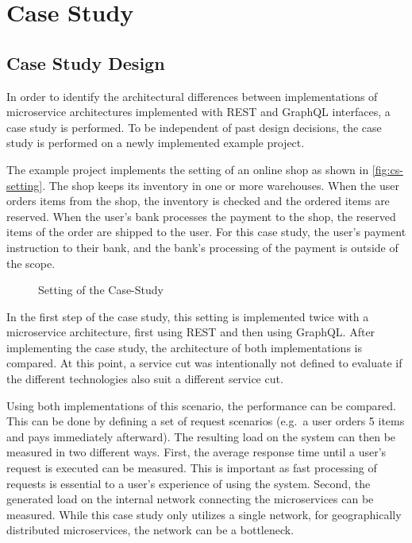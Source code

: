 \section{Case Study}\label{sec:case-study}

\subsection{Case Study Design}

In order to identify the architectural differences between implementations of microservice architectures implemented with REST and GraphQL interfaces, a case study is performed.
To be independent of past design decisions, the case study is performed on a newly implemented example project.

The example project implements the setting of an online shop as shown in \autoref{fig:cs-setting}.
The shop keeps its inventory in one or more warehouses.
When the user orders items from the shop, the inventory is checked and the ordered items are reserved.
When the user's bank processes the payment to the shop, the reserved items of the order are shipped to the user.
For this case study, the user's payment instruction to their bank, and the bank's processing of the payment is outside of the scope.

\begin{figure}[!htb]
    \centering
    
    \caption{Setting of the Case-Study}\label{fig:cs-setting}
\end{figure}

In the first step of the case study, this setting is implemented twice with a microservice architecture, first using \ac{REST} and then using GraphQL.%
After implementing the case study, the architecture of both implementations is compared.
At this point, a service cut was intentionally not defined to evaluate if the different technologies also suit a different service cut.

Using both implementations of this scenario, the performance can be compared.
This can be done by defining a set of request scenarios (e.g.~a user orders 5 items and pays immediately afterward).
The resulting load on the system can then be measured in two different ways.
First, the average response time until a user's request is executed can be measured.
This is important as fast processing of requests is essential to a user's experience of using the system.
Second, the generated load on the internal network connecting the microservices can be measured.
While this case study only utilizes a single network, for geographically distributed microservices, the network can be a bottleneck.

